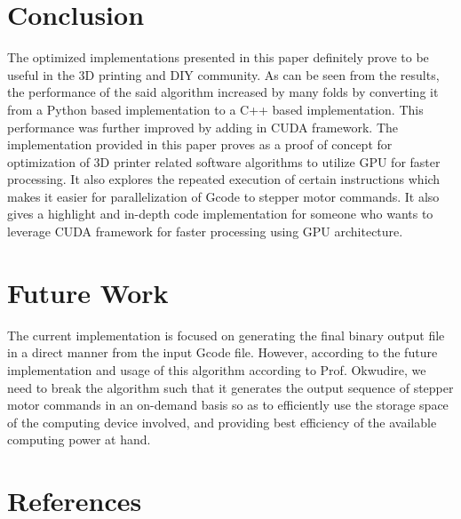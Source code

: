 \documentclass[12pt,letterpaper]{article}
\begin{document}
\section{Conclusion}
The optimized implementations presented in this paper definitely prove to be useful in the 3D printing and DIY community. As can be seen from the results, the performance of the said algorithm increased by many folds by converting it from a Python based implementation to a C++ based implementation. This performance was further improved by adding in CUDA framework. The implementation provided in this paper proves as a proof of concept for optimization of 3D printer related software algorithms to utilize GPU for faster processing. It also explores the repeated execution of certain instructions which makes it easier for parallelization of Gcode to stepper motor commands.
It also gives a highlight and in-depth code implementation for someone who wants to leverage CUDA framework for faster processing using GPU architecture.

\section{Future Work}
The current implementation is focused on generating the final binary output file in a direct manner from the input Gcode file. However, according to the future implementation and usage of this algorithm according to Prof. Okwudire, we need to break the algorithm such that it generates the output sequence of stepper motor commands in an on-demand basis so as to efficiently use the storage space of the computing device involved, and providing best efficiency of the available computing power at hand.

\section{References\label{sec:references}}

\printbibliography[heading=none]
\end{document}
